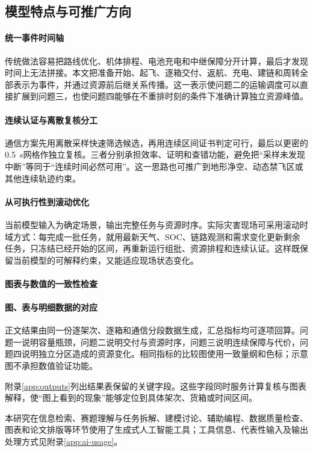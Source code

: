 \subsection{模型特点与可推广方向}
\paragraph{统一事件时间轴}
传统做法容易把路线优化、机体排程、电池充电和中继保障分开计算，最后才发现时间上无法拼接。本文把准备开始、起飞、逐箱交付、返航、充电、建链和周转全部表示为事件，并通过资源前后继关系传播。这一表示使问题二的运输调度可以直接扩展到问题三，也使问题四能够在不重排时刻的条件下准确计算独立资源峰值。

\paragraph{连续认证与离散复核分工}
通信方案先用离散采样快速筛选候选，再用连续区间证书判定可行，最后以更密的0.5~s网格作独立复核。三者分别承担效率、证明和查错功能，避免把“采样未发现中断”等同于“连续时间必然可用”。这一思路也可推广到地形净空、动态禁飞区或其他连续轨迹约束。

\paragraph{从可执行性到滚动优化}
当前模型输入为确定场景，输出完整任务与资源时序。实际灾害现场可采用滚动时域方式：每完成一批任务，就用最新天气、SOC、链路观测和需求变化更新剩余任务，只冻结已经开始的区间，再重新运行组批、资源排程和连续认证。这样既保留当前模型的可解释约束，又能适应现场状态变化。

\paragraph{图表与数值的一致性检查}
\paragraph{图、表与明细数据的对应}
正文结果由同一份逐架次、逐箱和通信分段数据生成，汇总指标均可逐项回算。问题一说明容量瓶颈，问题二说明交付与资源时序，问题三说明连续保障与代价，问题四说明独立分区造成的资源变化。相同指标的比较图使用一致量纲和色标；示意图不承担数值验证功能。

附录\ref{app:outputs}列出结果表保留的关键字段。这些字段同时服务计算复核与图表解释，使“图上看到的现象”能够定位到具体架次、货箱或时间区间。

本研究在信息检索、赛题理解与任务拆解、建模讨论、辅助编程、数据质量检查、图表和论文排版等环节使用了生成式人工智能工具；工具信息、代表性输入及输出处理方式见附录\ref{app:ai-usage}。
